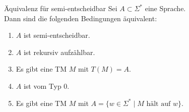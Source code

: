 \begin{Satz}{Äquivalenz für semi-entscheidbar}
    Sei $A \subset \Sigma^\ast$ eine Sprache.\\
    Dann sind die folgenden Bedingungen äquivalent:
    \begin{enumerate}[label=(\arabic*)]
        \item
        $A$ ist semi-entscheidbar.

        \item
        $A$ ist rekursiv aufzählbar.

        \item
        Es gibt eine TM $M$ mit $T(M) = A$.

        \item
        $A$ ist vom Typ 0.

        \item
        Es gibt eine TM $M$ mit $A = \{w \in \Sigma^\ast \;|\; M \text{ hält auf } w\}$.
    \end{enumerate}
\end{Satz}

